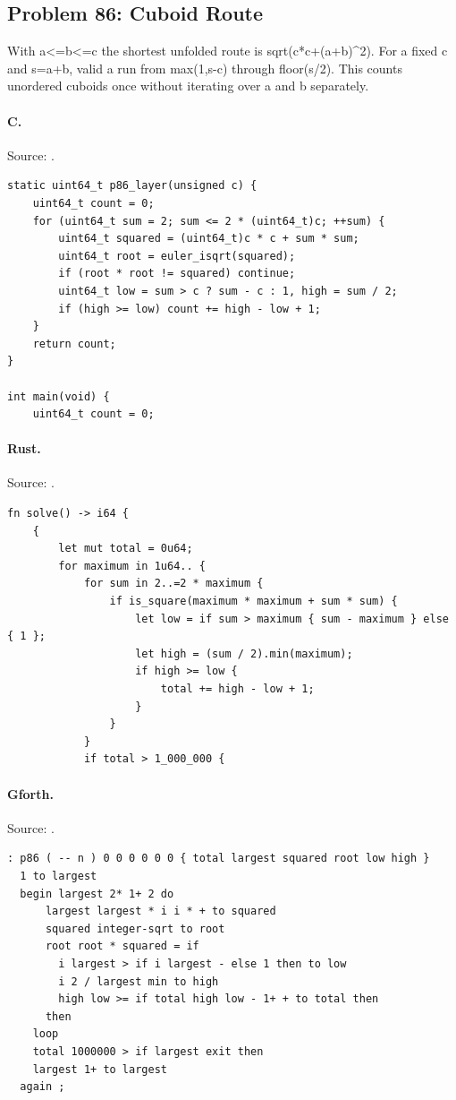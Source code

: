 \subsection{Problem 86: Cuboid Route}
\label{walkthrough:p86}
With a<=b<=c the shortest unfolded route is sqrt(c*c+(a+b)\textasciicircum{}2). For a fixed c and s=a+b, valid a run from max(1,s-c) through floor(s/2). This counts unordered cuboids once without iterating over a and b separately.

\paragraph{C.} Source: .
\begin{lstlisting}
static uint64_t p86_layer(unsigned c) {
    uint64_t count = 0;
    for (uint64_t sum = 2; sum <= 2 * (uint64_t)c; ++sum) {
        uint64_t squared = (uint64_t)c * c + sum * sum;
        uint64_t root = euler_isqrt(squared);
        if (root * root != squared) continue;
        uint64_t low = sum > c ? sum - c : 1, high = sum / 2;
        if (high >= low) count += high - low + 1;
    }
    return count;
}

int main(void) {
    uint64_t count = 0;
\end{lstlisting}

\paragraph{Rust.} Source: .
\begin{lstlisting}
fn solve() -> i64 {
    {
        let mut total = 0u64;
        for maximum in 1u64.. {
            for sum in 2..=2 * maximum {
                if is_square(maximum * maximum + sum * sum) {
                    let low = if sum > maximum { sum - maximum } else { 1 };
                    let high = (sum / 2).min(maximum);
                    if high >= low {
                        total += high - low + 1;
                    }
                }
            }
            if total > 1_000_000 {
\end{lstlisting}

\paragraph{Gforth.} Source: .
\begin{lstlisting}
: p86 ( -- n ) 0 0 0 0 0 0 { total largest squared root low high }
  1 to largest
  begin largest 2* 1+ 2 do
      largest largest * i i * + to squared
      squared integer-sqrt to root
      root root * squared = if
        i largest > if i largest - else 1 then to low
        i 2 / largest min to high
        high low >= if total high low - 1+ + to total then
      then
    loop
    total 1000000 > if largest exit then
    largest 1+ to largest
  again ;
\end{lstlisting}

